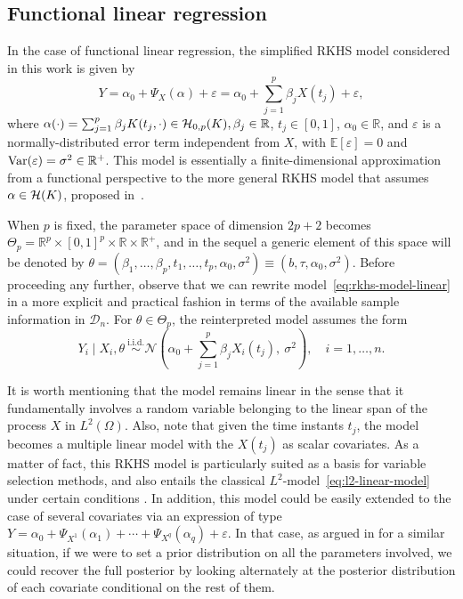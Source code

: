 \documentclass[ba]{imsart}
\numberwithin{equation}{section}
\theoremstyle{plain}
\renewcommand{\epsilon}{\varepsilon}
\newcommand{\R}{\mathbb{R}}
\newcommand{\E}{\mathbb{E}}
\newcommand{\Hcal}{\ensuremath\mathcal{H}}
\newcommand{\Var}{\ensuremath\operatorname{Var}}
\begin{document}
\subsection{Functional linear regression}\label{sec:rkhs-linear-model}

In the case of functional linear regression, the simplified RKHS model considered in this work is given by
\begin{equation}\label{eq:rkhs-model-linear}
  Y = \alpha_0 + \Psi_X(\alpha) + \epsilon = \alpha_0 + \sum_{j=1}^p \beta_j X(t_j) + \epsilon,
\end{equation}
where \(\alpha(\cdot)=\sum_{j=1}^p\beta_jK(t_j, \cdot) \in \Hcal_{0,p}(K), \beta_j \in \R\), \(t_j \in [0, 1]\), \(\alpha_0\in\R\), and \(\epsilon\) is a normally-distributed error term independent from \(X\), with \(\E[\epsilon]=0\) and \(\Var(\epsilon)=\sigma^2\in \R^+\). This model is essentially a finite-dimensional approximation from a functional perspective to the more general RKHS model that assumes \(\alpha \in \Hcal(K)\), proposed in~\citet{berrendero2019rkhs}.

When \(p\) is fixed, the parameter space of dimension \(2p + 2\) becomes \(\Theta_p = \R^p \times [0, 1]^p \times \R \times \R^+\), and in the sequel a generic element of this space will be denoted by \(\theta = (\beta_1,\dots, \beta_p, t_1,\dots, t_p, \alpha_0, \sigma^2) \equiv (b, \tau, \alpha_0, \sigma^2)\). Before proceeding any further, observe that we can rewrite model~\eqref{eq:rkhs-model-linear} in a more explicit and practical fashion in terms of the available sample information in \(\mathcal D_n\). For \(\theta \in \Theta_p\), the reinterpreted model assumes the form
\begin{equation}\label{eq:rkhs-model-linear-2}
  Y_i \mid X_i, \theta \ \stackrel{\text{i.i.d.}}{\sim} \mathcal N\left(\alpha_0 + \sum_{j=1}^p \beta_j X_i(t_j), \ \sigma^2\right), \quad i =1,\dots, n.
\end{equation}

It is worth mentioning that the model remains linear in the sense that it fundamentally involves a random variable belonging to the linear span of the process \(X\) in \(L^2(\Omega)\). Also, note that given the time instants \(t_j\), the model becomes a multiple linear model with the \(X(t_j)\) as scalar covariates. As a matter of fact, this RKHS model is particularly suited as a basis for variable selection methods, and also entails the classical \(L^2\)-model~\eqref{eq:l2-linear-model} under certain conditions \citep[see][Sec.~3]{berrendero2020general}. In addition, this model could be easily extended to the case of several covariates via an expression of type \(Y=\alpha_0 + \Psi_{X^{1}}(\alpha_1) + \cdots + \Psi_{X^{q}}(\alpha_q) + \epsilon\). In that case, as argued in \citet{grollemund2019bayesian} for a similar situation, if we were to set a prior distribution on all the parameters involved, we could recover the full posterior by looking alternately at the posterior distribution of each covariate conditional on the rest of them.
\end{document}
